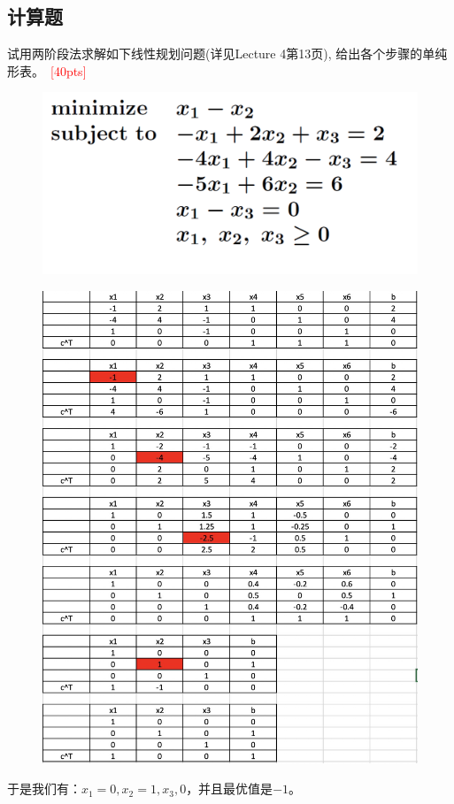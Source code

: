 \documentclass[10pt]{article}
\begin{document}
\subsection{计算题}
试用两阶段法求解如下线性规划问题(详见Lecture 4第13页), 给出各个步骤的单纯形表。~\textcolor{red}{[40pts]}
\begin{figure}[H]
	\centering
	\includegraphics[width=0.4\linewidth]{hw3_3.png}
	\label{fig.prob3}
\end{figure}

\begin{figure}[H]
	\centering
	\includegraphics[width=0.4\linewidth]{table.png}
\end{figure}
于是我们有：$x_1=0,x_2=1,x_3,0$，并且最优值是$-1$。
\end{document}
